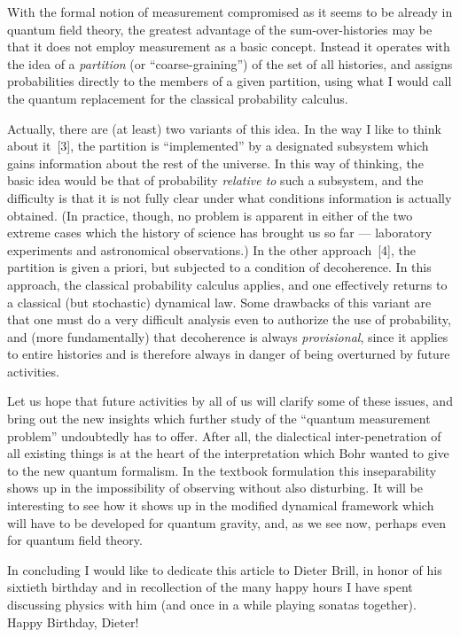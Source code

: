 \tx
With the formal notion of measurement compromised as it seems to be
already in quantum field theory, the
greatest advantage of the sum-over-histories may be that it does not
employ measurement as a basic concept.  Instead it operates with the
idea of a {\it partition} (or ``coarse-graining'') of the set of all
histories, and assigns probabilities directly to the members of a
given partition, using what I would call the quantum replacement for
the classical probability calculus.

\tx
Actually, there are (at least) two variants of this idea.  In the way
I like to think about it~[3], the partition is ``implemented'' by a
designated subsystem which gains information about the rest of the
universe.  In this way of thinking, the basic idea would be that of
probability {\it relative to} such a subsystem, and the difficulty is
that it is not fully
clear under what conditions information is actually
obtained.  (In practice, though, no problem is apparent in either of
the two extreme cases which the history of science has brought us so
far --- laboratory experiments and astronomical observations.)  In the
other approach~[4], the partition is given a priori, but subjected to
a condition of decoherence.  In this approach, the classical
probability calculus applies, and one effectively returns to a
classical (but stochastic) dynamical law.  Some drawbacks of this
variant are that one must do a very difficult analysis even to
authorize the use of probability, and (more fundamentally) that
decoherence is always {\it provisional}, since it applies to entire
histories and is therefore always in danger of being overturned by
future activities.

\tx
Let us hope that future activities by all of us will clarify some of
these issues, and bring out the new insights which further study of
the ``quantum measurement problem'' undoubtedly has to offer.  After
all, the dialectical inter-penetration of all existing things is at the
heart of the interpretation which Bohr wanted to give to the new
quantum formalism.  In the textbook formulation this inseparability
shows up in the impossibility of observing without also disturbing.
It will be interesting to see how it shows up in the modified
dynamical framework which will have to be developed for quantum
gravity, and, as we see now, perhaps even for quantum field theory.


\tx
In concluding I would like to dedicate this article to Dieter Brill,
in honor of his sixtieth birthday and in recollection of the many
happy hours I have spent discussing physics with him (and once in a
while playing sonatas together).  Happy Birthday, Dieter!

